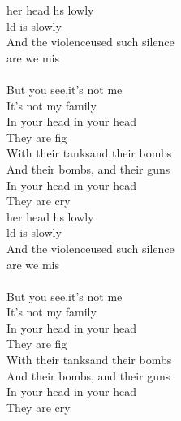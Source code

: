 \begin{cancion}%
	her head hs lowly\\
	ld is slowly   \\
	And the violenceused such silence\\
	 are we mis\\
	\jump\\
\jump
	But you see,it's not me\\
	It's not my  family\\
	In your head  in your head\\
	They are fig\\
	With their tanksand their bombs\\
	And their bombs,  and their guns\\
	In your head   in your head \\
	They are cry\\
\jump
	her head hs lowly\\
	ld is slowly   \\
	And the violenceused such silence\\
	 are we mis\\
	\jump\\
\jump
	But you see,it's not me\\
	It's not my  family\\
	In your head  in your head\\
	They are fig\\
	With their tanksand their bombs\\
	And their bombs,  and their guns\\
	In your head   in your head \\
	They are cry\\
\end{cancion}%

